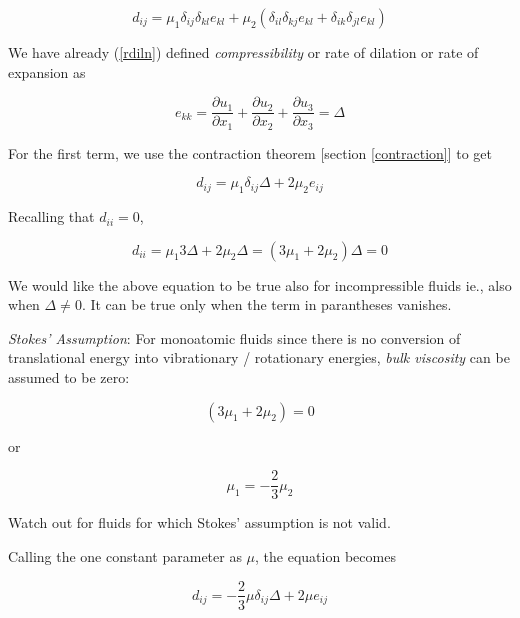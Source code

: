 \begin{equation}
d_{ij} = \mu_1 \delta_{ij}\delta_{kl}e_{kl} + \mu_2 \left( \delta_{il}\delta_{kj}e_{kl} + \delta_{ik}\delta_{jl}e_{kl} \right)
\end{equation} 


We have already (\ref{rdiln}) defined {\em compressibility} or {rate of dilation} or rate of expansion as

\begin{equation}
e_{kk} = \frac{\partial u_1}{\partial x_1} + \frac{\partial u_2}{\partial x_2} + \frac{\partial u_3}{\partial x_3} = \Delta 
\end{equation} 

For the first term, we use the contraction theorem [section \ref{contraction}] to get

\begin{equation}
d_{ij} = \mu_1 \delta_{ij}\Delta + 2 \mu_2 e_{ij}
\end{equation} 

Recalling that $d_{ii}=0$,

\begin{equation}
d_{ii} = \mu_1 3 \Delta + 2 \mu_2 \Delta = (3 \mu_1 + 2 \mu_2) \Delta = 0
\end{equation} 

We would like the above equation to be true also for incompressible fluids ie., also when $\Delta \ne 0$. It can be true only when the term in parantheses vanishes.


{\em Stokes' Assumption}: For monoatomic fluids since there is no conversion of translational energy into vibrationary / rotationary energies, {\em bulk viscosity} can be assumed to be zero:

$$(3 \mu_1 + 2 \mu_2)=0$$ 

or

\begin{equation}
\mu_1 = -\frac{2}{3} \mu_2 
\end{equation} 

Watch out for fluids for which Stokes' assumption is not valid. 

Calling the one constant parameter as $\mu$, the equation becomes

\begin{equation}
d_{ij} = - \frac{2}{3} \mu \delta_{ij} \Delta + 2 \mu e_{ij}
\end{equation} 

